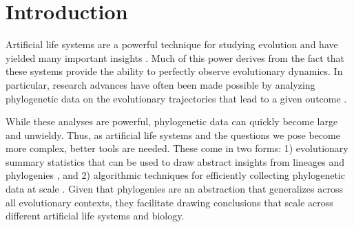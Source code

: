 \section{Introduction}
\label{sec:introduction}

Artificial life systems are a powerful technique for studying evolution and have yielded many important insights \citep{wilkeEvolutionDigitalOrganisms2001,zamanCoevolutionDrivesEmergence2014,goldsbyEvolutionaryOriginSomatic2014}.
Much of this power derives from the fact that these systems provide the ability to perfectly observe evolutionary dynamics.
In particular, research advances have often been made possible by analyzing phylogenetic data on the evolutionary trajectories that lead to a given outcome \citep{lenskiEvolutionaryOriginComplex2003,lalejiniEvolutionaryOriginsPhenotypic2016,johnsonEndosymbiosisBustInfluence2022a}.

While these analyses are powerful, phylogenetic data can quickly become large and unwieldy.
Thus, as artificial life systems and the questions we pose become more complex, better tools are needed.
These come in two forms: 1) evolutionary summary statistics that can be used to draw abstract insights from lineages and phylogenies \citep{dolsonInterpretingTapeLife2020}, and 2) algorithmic techniques for efficiently collecting phylogenetic data at scale \citep{morenoHereditaryStratigraphyGenome2022}.
Given that phylogenies are an abstraction that generalizes across all evolutionary contexts, they facilitate drawing conclusions that scale across different artificial life systems and biology.


